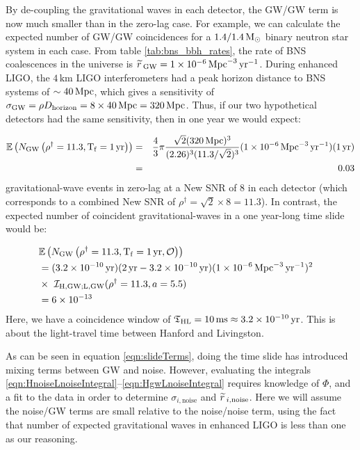 By de-coupling the gravitational waves in each detector, the GW/GW term is now much smaller than in the zero-lag case. For example, we can calculate the expected number of GW/GW coincidences for a $1.4/1.4\,\mathrm{M_\odot}$ binary neutron star system in each case. From table \ref{tab:bns_bbh_rates}, the rate of \ac{BNS} coalescences in the universe is $\widetilde{r}\,_{\mathrm{GW}} = 1 \times 10^{-6} \,\mathrm{Mpc}^{-3}\,\mathrm{yr}^{-1}$. During enhanced \ac{LIGO}, the $4\,\mathrm{km}$ \ac{LIGO} interferometers had a peak horizon distance to \ac{BNS} systems of $\sim40\,\mathrm{Mpc}$, which gives a sensitivity of $\sigma_{\mathrm{GW}} = \rho D_{\mathrm{horizon}} = 8 \times 40\,\mathrm{Mpc} = 320\,\mathrm{Mpc}$. Thus, if our two hypothetical detectors had the same sensitivity, then in one year we would expect:

\begin{eqnarray}
\mathbb{E}\left( N_{\mathrm{GW}} \left( \rho^{\dagger}  =  11.3, \mathrm{T_f} = 1 \,\mathrm{yr} \right)\right) & = & \frac{4}{3} \pi \frac{\sqrt{2} (320\,\mathrm{Mpc})^3}{(2.26)^3 (11.3 / \sqrt{2})^3} (1 \times 10^{-6}\,\mathrm{Mpc}^{-3}\,\mathrm{yr^{-1}}) (1\,\mathrm{yr}) \nonumber \\
 & = & 0.03 \nonumber
\end{eqnarray}
gravitational-wave events in zero-lag at a New \ac{SNR} of $8$ in each detector (which corresponds to a combined New SNR of $\rho^\dagger = \sqrt{2} \times 8 = 11.3$). In contrast, the expected number of coincident gravitational-waves in a one year-long time slide would be:

\begin{align*}
\lefteqn{\Exptd\left( N_{\mathrm{GW}} \left(\rho^{\dagger} = 11.3, \Tf = 1\,\mathrm{yr}, \mathcal{O} \right) \right)} \\
 &= (3.2 \times 10^{-10}\yr) ( 2\yr - 3.2\times10^{-10}\yr ) (1\times10^{-6}\Mpc^{-3}\yr^{-1})^2 \\
 & \times ~ \mathcal{I}_{\mathrm{H,GW;L,GW}}(\rho^\dagger = 11.3, a = 5.5) \\
 &= 6 \times 10^{-13}
\end{align*}
Here, we have a coincidence window of $\mathfrak{T}_{\mathrm{H}\mathrm{L}} = 10\,\mathrm{ms} \approx 3.2\times10^{-10}\,\mathrm{yr}$. This is about the light-travel time between Hanford and Livingston.

As can be seen in equation \ref{eqn:slideTerms}, doing the time slide has introduced mixing terms between \acs{GW} and noise. However, evaluating the integrals \ref{eqn:HnoiseLnoiseIntegral}--\ref{eqn:HgwLnoiseIntegral} requires knowledge of $\Phi$, and a fit to the data in order to determine $\sigma_{i,\mathrm{noise}}$ and $\widetilde{r}\,_{i,\mathrm{noise}}$. Here we will assume the noise/GW terms are small relative to the noise/noise term, using the fact that number of expected gravitational waves in enhanced \ac{LIGO} is less than one as our reasoning. %

